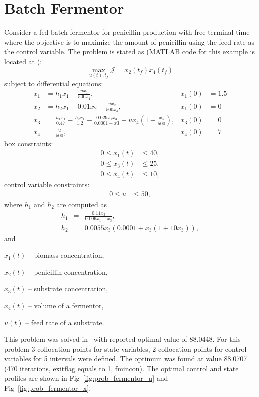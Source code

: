 \section{Batch Fermentor}
\label{sec:prob_fermentor}
Consider a fed-batch fermentor for penicillin production with free
terminal time~\citep{ban05} where the objective is to maximize the
amount of penicillin using the feed rate as the control variable. The
problem is stated as (MATLAB code for this example is located at
): 
\begin{equation}
\max_{u(t),t_f} \mathcal{J} = x_{2}(t_{f})x_{4}(t_{f})
\end{equation}
subject to differential equations:
\begin{align}
\dot{x}_1 & = 
h_1x_1-\frac{u x_1}{500 x_4}, &
x_1(0) &= 1.5  \\
\dot{x}_2 & = 
h_2x_1-0.01x_2-\frac{ux_2}{500x_4}, &
x_1(0) &= 0  \\
\dot{x}_3 &=
\frac{h_1x_1}{0.47}-\frac{h_2x_1}{1.2}-\frac{0.029x_1x_3}{0.0001+x3}+ux_4 \left( 1-\frac{x_3}{500} \right),
&
x_3(0) &= 0 \\ 
\dot{x}_4 &= \frac{u}{500}, &
x_4(0) &= 7
\end{align}
box constraints:
\begin{align}
0 \le x_1(t) &\le 40, \\
0 \le x_3(t) &\le 25, \\
0 \le x_4(t) &\le 10, 
\end{align}
control variable constraints:
\begin{align}
0 \le u &\le 50, 
\end{align}
where $h_1$ and $h_2$ are computed as
\begin{eqnarray} 
h_1 &=& \frac{0.11x_3}{0.006x_1+x_3}, \\
h_2 &=& 0.0055x_3(0.0001+x_3(1+10x_3)),
\end{eqnarray}
and 
\begin{description}
	\item $x_1(t)$ -- biomass concentration,
	\item $x_2(t)$ -- penicillin concentration,
	\item $x_3(t)$ -- substrate concentration,
	\item $x_4(t)$ -- volume of a fermentor,
	\item $u(t)$ -- feed rate of a substrate.
\end{description}

This problem was solved in~\citep{rut10} with reported optimal value of 88.0448. For this problem 3 collocation points for state variables, 2 collocation points for control variables for 5 intervals were defined. The optimum was found at value 88.0707 (470 iterations, exitflag equals to 1, fmincon). The optimal control and state profiles are shown in Fig~\ref{fig:prob_fermentor_u} and Fig~\ref{fig:prob_fermentor_x}.

